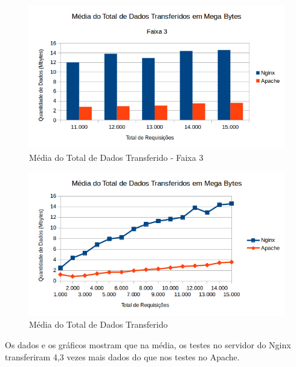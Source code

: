 \begin{figure}[H]
	\centering
	\includegraphics[width=1\linewidth]{graficos/grafico2-f3} 
	\caption{Média do Total de Dados Transferido - Faixa 3}
	\label{fig:grafico2-f3}
\end{figure}

\begin{figure}[H]
	\centering
	\includegraphics[width=1\linewidth]{graficos/grafico2} 
	\caption{Média do Total de Dados Transferido}
	\label{fig:grafico2}
\end{figure}

Os dados e os gráficos mostram que na média, os testes no servidor do Nginx 
transferiram 4,3 vezes mais dados do que nos testes no Apache.


